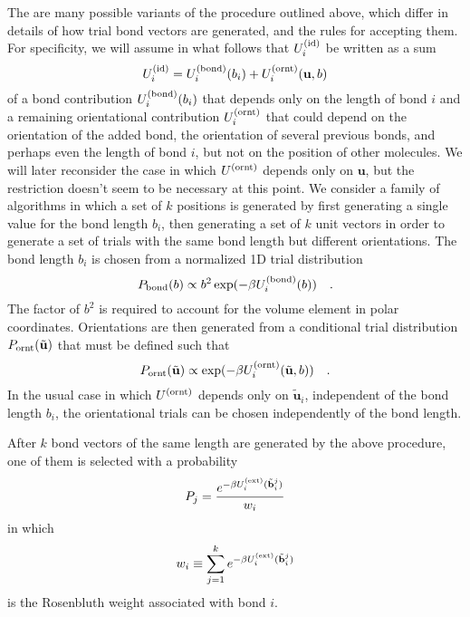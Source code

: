 \documentclass[12pt]{article} %
\newcommand{\vv}[1]{\mathbf{#1}}
\newcommand\Uid{U^{({\rm id})}}
\newcommand\Uext{U^{({\rm ext})}}
\newcommand\ubond{\vv{u}}
\newcommand\rbond{b}
\newcommand\ntrial{k}
\newcommand\vtrial{\tilde{\vv{b}}}
\newcommand\utrial{\tilde{\vv{u}}}
\newcommand\Ubond{U^{({\rm bond})}}
\newcommand\Uornt{U^{({\rm ornt})}}
\newcommand\Pbond{P_{{\rm bond}}}
\newcommand\Pornt{P_{{\rm ornt}}}
\begin{document}
The are many possible variants of the procedure outlined above, which differ in 
details of how trial bond vectors are generated, and the rules for accepting them. 
For specificity, we will assume in what follows that $\Uid_{i}$ be written as a sum
\begin{equation}
   \Uid_{i} = \Ubond_{i}(\rbond_{i}) + \Uornt_{i}(\ubond, \rbond)
\end{equation}
of a bond contribution $\Ubond_{i}(\rbond_{i})$ that depends only on the length of bond 
$i$ and a remaining orientational contribution $\Uornt_{i}$ that could depend on the
orientation of the added bond, the orientation of several previous bonds, and perhaps
even the length of bond $i$, but not on the position of other molecules. We will later
reconsider the case in which $\Uornt$ depends only on $\ubond$, but the restriction
doesn't seem to be necessary at this point. We consider a family of algorithms in 
which a set of $\ntrial$ positions is generated by first generating a single value 
for the bond length $\rbond_{i}$, then generating a set of $\ntrial$ unit vectors 
in order to generate a set of trials with the same bond length but different 
orientations.  The bond length $\rbond_{i}$ is chosen from a normalized 1D trial
distribution
\begin{equation}
    \Pbond(\rbond) \propto \rbond^{2} \exp( -\beta \Ubond_{i}(\rbond) )
    \quad.
\end{equation}
The factor of $\rbond^{2}$ is required to account for the volume element in polar
coordinates. Orientations are then generated from a conditional trial distribution 
$\Pornt(\utrial)$ that must be defined such that
\begin{equation}
    \Pornt(\utrial)
    \propto \exp( -\beta \Uornt_{i}(\utrial, \rbond))
    \quad.
\end{equation}
In the usual case in which $\Uornt$ depends only on $\utrial_{i}$, independent of 
the bond length $\rbond_{i}$, the orientational trials can be chosen independently 
of the bond length. 

After $\ntrial$ bond vectors of the same length are generated by the above procedure, 
one of them is selected with a probability
\begin{equation}
    P_{j} = \frac{e^{-\beta\Uext_{i}(\vtrial^{j}_{i})}}{w_{i}}
\end{equation}
in which 
\begin{equation}
     w_{i} \equiv \sum_{j=1}^{\ntrial} e^{ -\beta \Uext_{i}(\vtrial^{j}_{i})}
     \label{RosenbluthBond}
\end{equation}
is the Rosenbluth weight associated with bond $i$.
\end{document}
